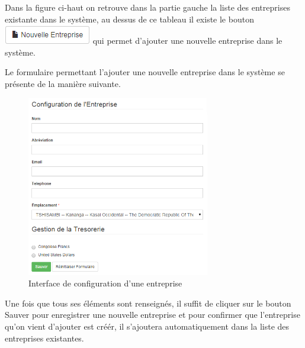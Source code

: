 \documentclass[12pt,a4paper]{report}
\begin{document}
Dans la figure ci-haut on retrouve dans la partie gauche la liste des entreprises existante dans le système, au dessus de ce tableau il existe le bouton \includegraphics[scale=1]{pic/New_Entre.png} qui permet d'ajouter une nouvelle entreprise dans le système.

Le formulaire permettant l'ajouter une nouvelle entreprise dans le système se présente de la manière suivante.
\begin{figure}[h]
\begin{center}
\includegraphics[width=8cm]{pic/Config_entreprise.png}
\end{center}
\caption{Interface de configuration d'une entreprise}
\label{Interface principale de la gestion des utilisateurs}
\end{figure} 

Une fois que tous ses éléments sont renseignés, il suffit de cliquer sur le bouton Sauver pour enregistrer une nouvelle entreprise et pour confirmer que l'entreprise qu'on vient d'ajouter est créér, il s'ajoutera automatiquement dans la liste des entreprises existantes. 
\end{document}
